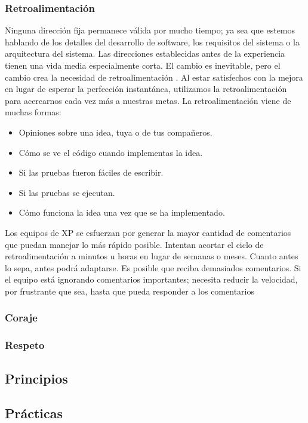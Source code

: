 \begin{spacing}{1.5}
		\subsubsection{Retroalimentaci\'{o}n}
		Ninguna dirección fija permanece válida por mucho tiempo; ya sea que estemos hablando de los detalles del desarrollo de software, los requisitos del sistema o la arquitectura del sistema. Las direcciones establecidas antes de la experiencia tienen una vida media especialmente corta. El cambio es inevitable, pero el cambio crea la necesidad de retroalimentación \cite{chap2_extreme_programming}.
		Al estar satisfechos con la mejora en lugar de esperar la perfección instantánea, utilizamos la retroalimentación para acercarnos cada vez más a nuestras metas. La retroalimentación viene de muchas formas:
		\begin{itemize}
			\item Opiniones sobre una idea, tuya o de tus compañeros.
			\item Cómo se ve el código cuando implementas la idea.
			\item Si las pruebas fueron fáciles de escribir.
			\item Si las pruebas se ejecutan.
			\item Cómo funciona la idea una vez que se ha implementado.
		\end{itemize}
		Los equipos de XP se esfuerzan por generar la mayor cantidad de comentarios que puedan manejar lo más rápido posible. Intentan acortar el ciclo de retroalimentación a minutos u horas en lugar de semanas o meses. Cuanto antes lo sepa, antes podrá adaptarse. Es posible que reciba demasiados comentarios. Si el equipo está ignorando comentarios importantes; necesita reducir la velocidad, por frustrante que sea, hasta que pueda responder a los comentarios
		\subsubsection{Coraje}
		\subsubsection{Respeto}
	\subsection{Principios}
				\lipsum[1]
	\subsection{Pr\'{a}cticas}
				\lipsum[1]

\end{spacing}
